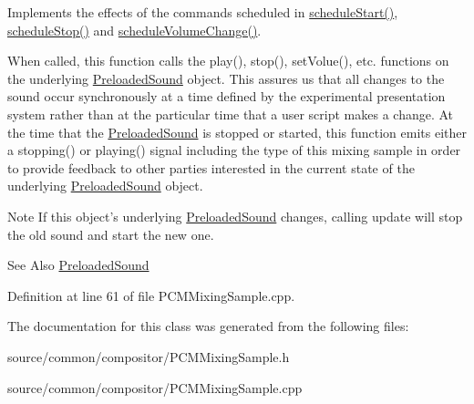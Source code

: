 Implements the effects of the commands scheduled in \hyperlink{class_picto_1_1_p_c_m_mixing_sample_a01bdf31cdb69f75d073ec7f74116d978}{schedule\-Start()}, \hyperlink{class_picto_1_1_p_c_m_mixing_sample_a5bbf61241bcd000a280bac4fb0970a5e}{schedule\-Stop()} and \hyperlink{class_picto_1_1_p_c_m_mixing_sample_a1876bd598742dbe7c47b5cb56758333d}{schedule\-Volume\-Change()}. 

When called, this function calls the play(), stop(), set\-Volue(), etc. functions on the underlying \hyperlink{class_picto_1_1_preloaded_sound}{Preloaded\-Sound} object. This assures us that all changes to the sound occur synchronously at a time defined by the experimental presentation system rather than at the particular time that a user script makes a change. At the time that the \hyperlink{class_picto_1_1_preloaded_sound}{Preloaded\-Sound} is stopped or started, this function emits either a stopping() or playing() signal including the type of this mixing sample in order to provide feedback to other parties interested in the current state of the underlying \hyperlink{class_picto_1_1_preloaded_sound}{Preloaded\-Sound} object. \begin{DoxyNote}{Note}
If this object's underlying \hyperlink{class_picto_1_1_preloaded_sound}{Preloaded\-Sound} changes, calling update will stop the old sound and start the new one. 
\end{DoxyNote}
\begin{DoxySeeAlso}{See Also}
\hyperlink{class_picto_1_1_preloaded_sound}{Preloaded\-Sound} 
\end{DoxySeeAlso}


Definition at line 61 of file P\-C\-M\-Mixing\-Sample.\-cpp.



The documentation for this class was generated from the following files\-:\begin{DoxyCompactItemize}
\item 
source/common/compositor/P\-C\-M\-Mixing\-Sample.\-h\item 
source/common/compositor/P\-C\-M\-Mixing\-Sample.\-cpp\end{DoxyCompactItemize}
